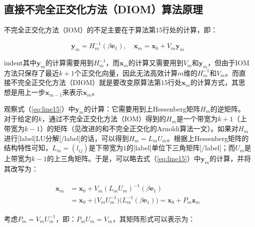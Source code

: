 \documentclass[UTF8,nofonts]{ctexart}
\begin{document}
\subsection*{直接不完全正交化方法（DIOM）算法原理}

不完全正交化方法（IOM）的不足主要在于算法第$15$行处的计算，即：

\begin{equation}
\label{eq:line15}
\boldsymbol{y}_m=H_m^{-1}(\beta\boldsymbol{e}_1),\quad\boldsymbol{x}_m=\boldsymbol{x}_0+V_m\boldsymbol{y}_m
\end{equation}

indent其中$\boldsymbol{y}_m$的计算需要用到$H_m^{-1}$，而$\boldsymbol{x}_m$的计算又需要用到$V_m$和$\boldsymbol{y}_m$，但由于IOM方法只保存了最近$k+1$个正交化向量，因此无法高效计算$m$维的$H_m^{-1}$和$V_m$。而直接不完全正交化方法（DIOM）就是要改变原算法第$15$行处$\boldsymbol{x}_m$的计算方式，其思想是用上一步$\boldsymbol{x}_{m-1}$来表示$\boldsymbol{x}_m$。

观察式（\ref{eq:line15}）中$\boldsymbol{y}_m$的计算：它需要用到上Hessenberg矩阵$H_m$的逆矩阵。对于给定的$k$，通过不完全正交化方法（IOM）得到的$H_m$是一个带宽为$k+1$（上带宽为$k-1$）的矩阵（见改进的和不完全正交化的Arnoldi算法一文）。如果对$H_m$进行[label]LU分解[/label]的话，可以得到$H_m=L_mU_m$。根据上Hessenberg矩阵的结构特性可知，$L_m=(l_{ij})$是下带宽为$1$的[label]单位下三角矩阵[/label]；而$U_m$是上带宽为$k-1$的上三角矩阵。于是，可以略去式（\ref{eq:line15}）中$\boldsymbol{y}_m$的计算，并将其改写为：

\begin{align}
\label{eq:pz}
\begin{split}
\boldsymbol{x}_m&=\boldsymbol{x}_0+V_m(L_mU_m)^{-1}(\beta\boldsymbol{e}_1) \\
&=\boldsymbol{x}_0+\Big(V_mU_m^{-1}\Big)\Big(L_m^{-1}(\beta\boldsymbol{e}_1)\Big)=\boldsymbol{x}_0+P_m\boldsymbol{z}_m
\end{split}
\end{align}

考虑$P_m=V_mU_m^{-1}$，即：$P_mU_m=V_m$，其矩阵形式可以表示为：
\end{document}

